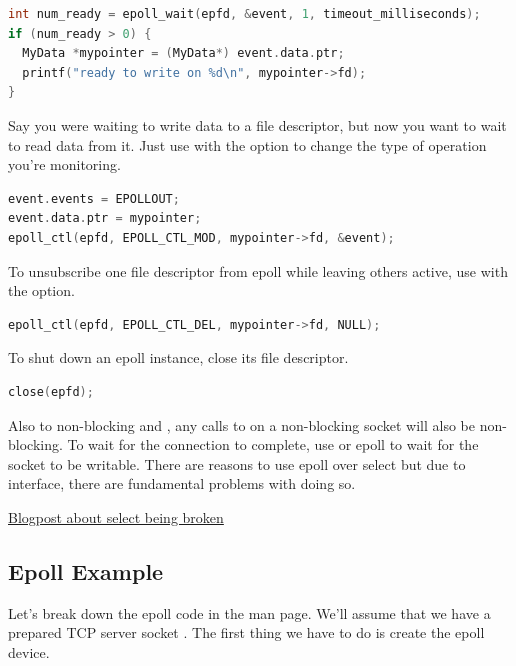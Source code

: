 \begin{lstlisting}[language=C]
int num_ready = epoll_wait(epfd, &event, 1, timeout_milliseconds);
if (num_ready > 0) {
  MyData *mypointer = (MyData*) event.data.ptr;
  printf("ready to write on %d\n", mypointer->fd);
}
\end{lstlisting}

Say you were waiting to write data to a file descriptor, but now you want to wait to read data from it.
Just use  with the  option to change the type of operation you're monitoring.

\begin{lstlisting}[language=C]
event.events = EPOLLOUT;
event.data.ptr = mypointer;
epoll_ctl(epfd, EPOLL_CTL_MOD, mypointer->fd, &event);
\end{lstlisting}

To unsubscribe one file descriptor from epoll while leaving others active, use  with the  option.

\begin{lstlisting}[language=C]
epoll_ctl(epfd, EPOLL_CTL_DEL, mypointer->fd, NULL);
\end{lstlisting}

To shut down an epoll instance, close its file descriptor.

\begin{lstlisting}[language=C]
close(epfd);
\end{lstlisting}

Also to non-blocking  and , any calls to  on a non-blocking socket will also be non-blocking.
To wait for the connection to complete, use  or epoll to wait for the socket to be writable.
There are reasons to use epoll over select but due to interface, there are fundamental problems with doing so.

\href{https://idea.popcount.org/2017-01-06-select-is-fundamentally-broken/}{Blogpost about select being broken}

\subsection{Epoll Example}

Let's break down the epoll code in the man page.
We'll assume that we have a prepared TCP server socket .
The first thing we have to do is create the epoll device.


